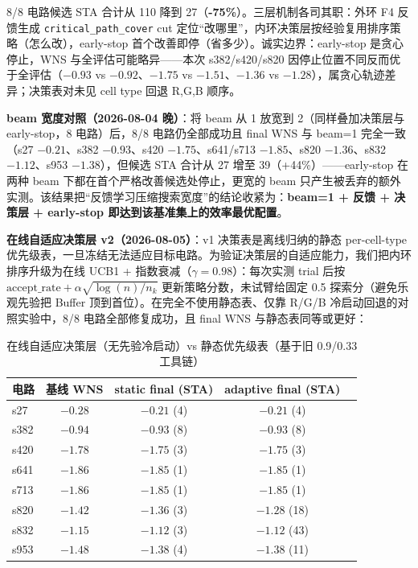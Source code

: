 \documentclass[journal]{IEEEtran}
\begin{document}
8/8 电路候选 STA 合计从 110 降到 27（\textbf{-75\%}）。三层机制各司其职：外环 F4 反馈生成 \texttt{critical\_path\_cover} cut 定位“改哪里”，内环决策层按经验复用排序策略（怎么改），early-stop 首个改善即停（省多少）。诚实边界：early-stop 是贪心停止，WNS 与全评估可能略异——本次 s382/s420/s820 因停止位置不同反而优于全评估（$-0.93$ vs $-0.92$、$-1.75$ vs $-1.51$、$-1.36$ vs $-1.28$），属贪心轨迹差异；决策表对未见 cell type 回退 R,G,B 顺序。

\textbf{beam 宽度对照（2026-08-04 晚）}：将 beam 从 1 放宽到 2（同样叠加决策层与 early-stop，8 电路）后，8/8 电路仍全部成功且 final WNS 与 beam=1 完全一致（s27 $-0.21$、s382 $-0.93$、s420 $-1.75$、s641/s713 $-1.85$、s820 $-1.36$、s832 $-1.12$、s953 $-1.38$），但候选 STA 合计从 27 增至 39（+44\%）——early-stop 在两种 beam 下都在首个严格改善候选处停止，更宽的 beam 只产生被丢弃的额外实测。该结果把“反馈学习压缩搜索宽度”的结论收紧为：\textbf{beam=1 + 反馈 + 决策层 + early-stop 即达到该基准集上的效率最优配置}。







\textbf{在线自适应决策层 v2（2026-08-05）}：v1 决策表是离线归纳的静态 per-cell-type 优先级表，一旦冻结无法适应目标电路。为验证决策层的自适应能力，我们把内环排序升级为在线 UCB1 + 指数衰减（$\gamma=0.98$）：每次实测 trial 后按 $\text{accept\_rate}+\alpha\sqrt{\log(n)/n_k}$ 更新策略分数，未试臂给固定 0.5 探索分（避免乐观先验把 Buffer 顶到首位）。在完全不使用静态表、仅靠 R/G/B 冷启动回退的对照实验中，8/8 电路全部修复成功，且 final WNS 与静态表同等或更好：

\begin{table}[!t]
\centering
\caption{在线自适应决策层（无先验冷启动）vs 静态优先级表（基于旧 0.9/0.33 工具链）}
\label{tab:adaptive_vs_static}
\scriptsize
\setlength{\tabcolsep}{3pt}
\begin{tabular}{lcccc}
\toprule
电路 & 基线 WNS & static final (STA) & adaptive final (STA) \\
\midrule
s27 & $-0.28$ & $-0.21$ (4) & $-0.21$ (4) \\
s382 & $-0.94$ & $-0.93$ (8) & $-0.93$ (8) \\
s420 & $-1.78$ & $-1.75$ (3) & $-1.75$ (3) \\
s641 & $-1.86$ & $-1.85$ (1) & $-1.85$ (1) \\
s713 & $-1.86$ & $-1.85$ (1) & $-1.85$ (1) \\
s820 & $-1.42$ & $-1.36$ (3) & $\mathbf{-1.28}$ (18) \\
s832 & $-1.15$ & $-1.12$ (3) & $-1.12$ (43) \\
s953 & $-1.48$ & $-1.38$ (4) & $-1.38$ (11) \\
\bottomrule
\end{tabular}
\end{table}
\end{document}

